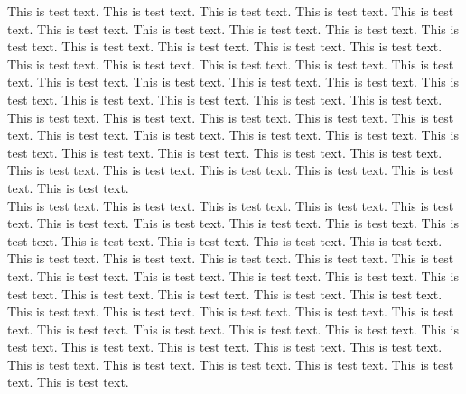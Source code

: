 \documentclass[11pt, english]{article}
\begin{document}
This is test text. This is test text. This is test text. This is test text. This is test text. This is test text. This is test text. This is test text. This is test text. This is test text. This is test text. This is test text. This is test text. This is test text. This is test text. This is test text. This is test text. This is test text. This is test text. This is test text. This is test text. This is test text. This is test text. This is test text. This is test text. This is test text. This is test text. This is test text. This is test text. This is test text. This is test text. This is test text. This is test text. This is test text. This is test text. This is test text. This is test text. This is test text. This is test text. This is test text. This is test text. This is test text. This is test text. This is test text. This is test text. This is test text. This is test text. This is test text.\\

This is test text. This is test text. This is test text. This is test text. This is test text. This is test text. This is test text. This is test text. This is test text. This is test text. This is test text. This is test text. This is test text. This is test text. This is test text. This is test text. This is test text. This is test text. This is test text. This is test text. This is test text. This is test text. This is test text. This is test text. This is test text. This is test text. This is test text. This is test text. This is test text. This is test text. This is test text. This is test text. This is test text. This is test text. This is test text. This is test text. This is test text. This is test text. This is test text. This is test text. This is test text. This is test text. This is test text. This is test text. This is test text. This is test text. This is test text. This is test text.\\
\end{document}
